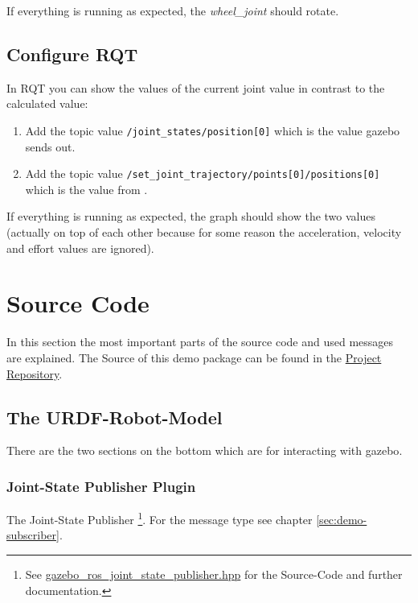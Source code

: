 If everything is running as expected, the \textit{wheel\_joint} should rotate.


\subsection[RQT Config]{Configure RQT} \label{sec:demo-rqt-config}

In RQT you can show the values of the current joint value in contrast to the calculated value:

\begin{enumerate}
    \item Add the topic value \texttt{/joint\_states/position[0]} which is the value \Gls{gazebo} sends out.
    \item Add the topic value \texttt{/set\_joint\_trajectory/points[0]/positions[0]} which is the value from .
\end{enumerate}

If everything is running as expected, the graph should show the two values (actually on top of each other because for some reason the acceleration, velocity and effort values are ignored).


\section[Source]{Source Code} \label{sec:demo-source-code}

In this section the most important parts of the source code and used messages are explained. The Source of this demo package can be found in the \href{https://github.com/LukyLuke/mse_vt_eeros/}{Project Repository}.

\subsection[URDF-Model]{The URDF-Robot-Model} \label{sec:demo-urdf-model}

There are the two sections on the bottom which are for interacting with \Gls{gazebo}.

\subsubsection[Joint-State]{Joint-State Publisher Plugin} \label{sec:demo-urdf-model-joint-state}

The Joint-State Publisher \footnote{See \href{https://github.com/ros-simulation/gazebo_ros_pkgs/blob/ros2/gazebo_plugins/include/gazebo_plugins/gazebo_ros_joint_state_publisher.hpp}{gazebo\_ros\_joint\_state\_publisher.hpp} for the Source-Code and further documentation.}.
For the message type see chapter \ref{sec:demo-subscriber}.

